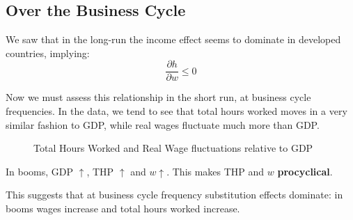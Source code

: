 \documentclass[11pt]{article}
\begin{document}
\subsection{Over the Business Cycle}

We saw that in the long-run the income effect seems to dominate in developed countries, implying:
\[\dfrac{\partial h}{\partial w}\leq0\]

Now we must assess this relationship in the short run, at business cycle frequencies. In the data, we tend to see that total hours worked moves in a very similar fashion to GDP, while real wages fluctuate much more than GDP.

\begin{figure}[h]
    \centering
    \qquad
    \caption{Total Hours Worked and Real Wage fluctuations relative to GDP}%
    \label{fig:panel format}%
\end{figure}

\begin{intu}
    In booms, GDP $\uparrow$, THP $ \uparrow$ and $w\uparrow$. This makes THP and $w$ \textbf{procyclical}. 
    
    This suggests that at business cycle frequency substitution effects dominate: in booms wages increase and total hours worked increase.
\end{intu}
\end{document}
